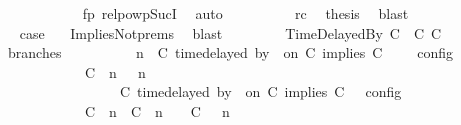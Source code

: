 \begin{isabellebody}
\ \ \ \ \ \ \ \ \ \ \isamarkupfalse%
\ fp\ relpowp{\isacharunderscore}Suc{\isacharunderscore}I{}\ \isamarkupfalse%
\ auto\isanewline
\ \ \ \ \ \ \ \ \isamarkupfalse%
\ rc\ \isamarkupfalse%
\ {\isacharquery}thesis\ \isamarkupfalse%
\ blast\isanewline
\ \ \ \ \ \ \isamarkupfalse%
\isanewline
\ \ \ \ \ \ \isamarkupfalse%
\ \isamarkupfalse%
\ {\isacharquery}case\ \ \isamarkupfalse%
\ ImpliesNot{\isachardot}prems{\isacharparenleft}{}{\isacharparenright}\ \isamarkupfalse%
\ blast\isanewline
\ \ \isamarkupfalse%
\isanewline
\ \ \ \ \isamarkupfalse%
\ {\isacharparenleft}TimeDelayedBy\ C\ {\isasymdelta}{\isasymtau}\ C\ C\isanewline
\ \ \ \ \ \ \isamarkupfalse%
\ branches{\isacharcolon}\isanewline
\ \ \ \ \ \ \ \ {\isacartoucheopen}{\isasymlbrakk}\ {\isasymGamma}{\isacharcomma}\ n\ {\isasymturnstile}\ {\isacharparenleft}{\isacharparenleft}C\ time{\isacharminus}delayed\ by\ {\isasymdelta}{\isasymtau}\ on\ C\ implies\ C\ {\isacharhash}\ {\isasymPsi}{\isacharparenright}\ {\isasymtriangleright}\ {\isasymPhi}\ {\isasymrbrakk}\isactrlsub c\isactrlsub o\isactrlsub n\isactrlsub f\isactrlsub i\isactrlsub g\isanewline
\ \ \ \ \ \ \ \ \ \ {\isacharequal}\ {\isasymlbrakk}\ {\isacharparenleft}{\isacharparenleft}C\ {\isasymnot}{\isasymUp}\ n{\isacharparenright}\ {\isacharhash}\ {\isasymGamma}{\isacharparenright}{\isacharcomma}\ n\isanewline
\ \ \ \ \ \ \ \ \ \ \ \ \ \ {\isasymturnstile}\ {\isasymPsi}\ {\isasymtriangleright}\ {\isacharparenleft}{\isacharparenleft}C\ time{\isacharminus}delayed\ by\ {\isasymdelta}{\isasymtau}\ on\ C\ implies\ C\ {\isacharhash}\ {\isasymPhi}{\isacharparenright}\ {\isasymrbrakk}\isactrlsub c\isactrlsub o\isactrlsub n\isactrlsub f\isactrlsub i\isactrlsub g\isanewline
\ \ \ \ \ \ \ \ \ \ {\isasymunion}\ {\isasymlbrakk}\ {\isacharparenleft}{\isacharparenleft}C\ {\isasymUp}\ n{\isacharparenright}\ {\isacharhash}\ {\isacharparenleft}C\ {\isacharat}\ n\ {\isasymoplus}\ {\isasymdelta}{\isasymtau}\ {\isasymRightarrow}\ C\ {\isacharhash}\ {\isasymGamma}{\isacharparenright}{\isacharcomma}\ n\isanewline

\end{isabellebody}
